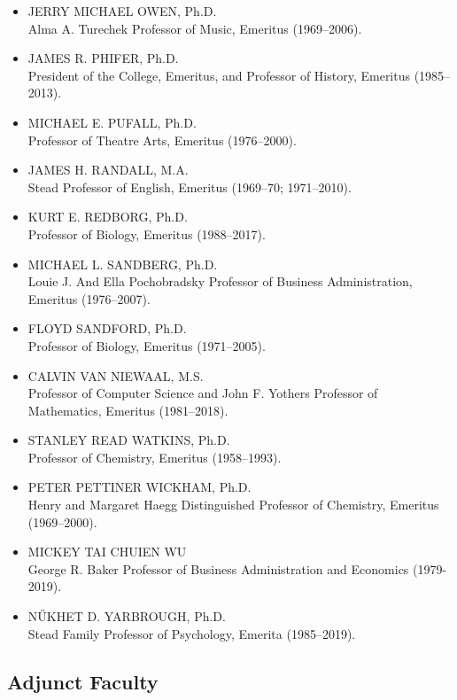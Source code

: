 \documentclass[
  letterpaper,
]{scrbook}
\begin{document}
\begin{itemize}
\item
  JERRY MICHAEL OWEN, Ph.D.\\
  Alma A. Turechek Professor of Music, Emeritus (1969--2006).
\item
  JAMES R. PHIFER, Ph.D.\\
  President of the College, Emeritus, and Professor of History, Emeritus
  (1985--2013).
\item
  MICHAEL E. PUFALL, Ph.D.\\
  Professor of Theatre Arts, Emeritus (1976--2000).
\item
  JAMES H. RANDALL, M.A.\\
  Stead Professor of English, Emeritus (1969--70; 1971--2010).
\item
  KURT E. REDBORG, Ph.D.\\
  Professor of Biology, Emeritus (1988--2017).
\item
  MICHAEL L. SANDBERG, Ph.D.\\
  Louie J. And Ella Pochobradsky Professor of Business Administration,
  Emeritus (1976--2007).
\item
  FLOYD SANDFORD, Ph.D.\\
  Professor of Biology, Emeritus (1971--2005).
\item
  CALVIN VAN NIEWAAL, M.S.\\
  Professor of Computer Science and John F. Yothers Professor of
  Mathematics, Emeritus (1981--2018).
\item
  STANLEY READ WATKINS, Ph.D.\\
  Professor of Chemistry, Emeritus (1958--1993).
\item
  PETER PETTINER WICKHAM, Ph.D.\\
  Henry and Margaret Haegg Distinguished Professor of Chemistry,
  Emeritus (1969--2000).
\item
  MICKEY TAI CHUIEN WU\\
  George R. Baker Professor of Business Administration and Economics
  (1979-2019).
\item
  NŰKHET D. YARBROUGH, Ph.D.\\
  Stead Family Professor of Psychology, Emerita (1985--2019).
\end{itemize}

\subsection{Adjunct Faculty}\label{adjunct-faculty}
\end{document}
